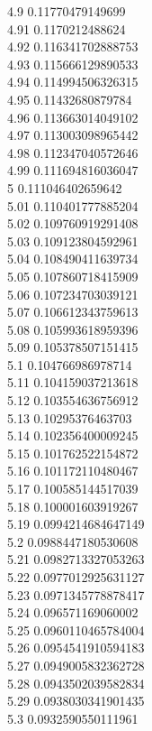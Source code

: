{4.9	0.11770479149699\\
4.91	0.1170212488624\\
4.92	0.116341702888753\\
4.93	0.115666129890533\\
4.94	0.114994506326315\\
4.95	0.11432680879784\\
4.96	0.113663014049102\\
4.97	0.113003098965442\\
4.98	0.112347040572646\\
4.99	0.111694816036047\\
5	0.111046402659642\\
5.01	0.110401777885204\\
5.02	0.109760919291408\\
5.03	0.109123804592961\\
5.04	0.108490411639734\\
5.05	0.107860718415909\\
5.06	0.107234703039121\\
5.07	0.106612343759613\\
5.08	0.105993618959396\\
5.09	0.105378507151415\\
5.1	0.104766986978714\\
5.11	0.104159037213618\\
5.12	0.103554636756912\\
5.13	0.10295376463703\\
5.14	0.102356400009245\\
5.15	0.101762522154872\\
5.16	0.101172110480467\\
5.17	0.100585144517039\\
5.18	0.100001603919267\\
5.19	0.0994214684647149\\
5.2	0.0988447180530608\\
5.21	0.0982713327053263\\
5.22	0.0977012925631127\\
5.23	0.0971345778878417\\
5.24	0.096571169060002\\
5.25	0.0960110465784004\\
5.26	0.0954541910594183\\
5.27	0.0949005832362728\\
5.28	0.0943502039582834\\
5.29	0.0938030341901435\\
5.3	0.0932590550111961\\
}
